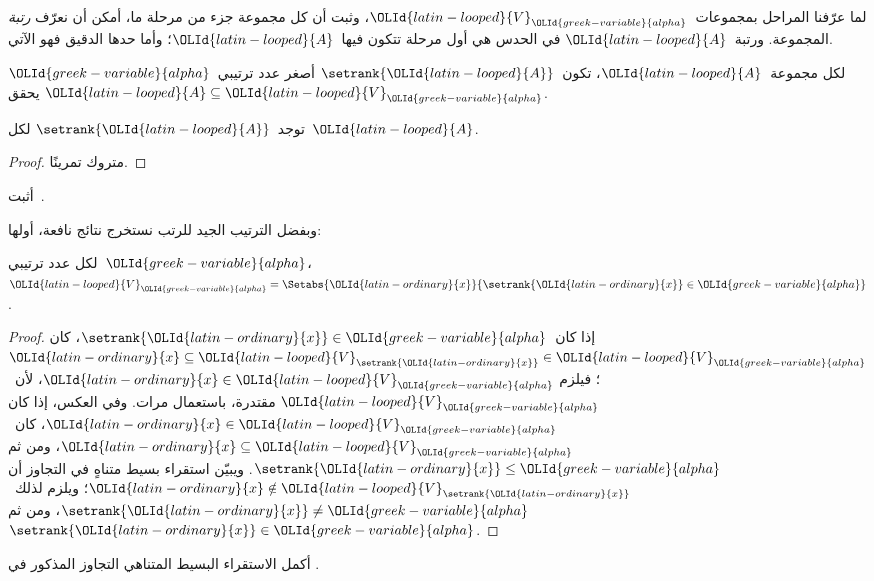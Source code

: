 \documentclass[../../../include/open-logic-section]{subfiles}
\begin{document}

لما عرّفنا المراحل بمجموعات~${\OLId{latin-looped}{V}}_{\OLId{greek-variable}{alpha}}$، وثبت أن كل مجموعة جزء من
مرحلة ما، أمكن أن نعرّف \emph{رتبة} المجموعة. ورتبة~${\OLId{latin-looped}{A}}$ في الحدس
هي أول مرحلة تتكون فيها~${\OLId{latin-looped}{A}}$؛ وأما حدها الدقيق فهو الآتي.

\begin{defn}
لكل مجموعة~${\OLId{latin-looped}{A}}$، تكون~$\setrank{{\OLId{latin-looped}{A}}}$ أصغر عدد ترتيبي~${\OLId{greek-variable}{alpha}}$ يحقق
${\OLId{latin-looped}{A}} \subseteq {\OLId{latin-looped}{V}}_{\OLId{greek-variable}{alpha}}$.
\end{defn}
\begin{prop}
	توجد~$\setrank{{\OLId{latin-looped}{A}}}$ لكل~${\OLId{latin-looped}{A}}$.
\end{prop}
\begin{proof}
	متروك تمرينًا.
\end{proof}
\begin{prob}
	أثبت~.
\end{prob}
\noindent
وبفضل الترتيب الجيد للرتب نستخرج نتائج نافعة، أولها:
\begin{prop}
لكل عدد ترتيبي~${\OLId{greek-variable}{alpha}}$،
${\OLId{latin-looped}{V}}_{\OLId{greek-variable}{alpha}} = \Setabs{{\OLId{latin-ordinary}{x}}}{\setrank{{\OLId{latin-ordinary}{x}}} \in {\OLId{greek-variable}{alpha}}}$.
\end{prop}

\begin{proof}
إذا كان~$\setrank{{\OLId{latin-ordinary}{x}}} \in {\OLId{greek-variable}{alpha}}$، كان
${\OLId{latin-ordinary}{x}} \subseteq {\OLId{latin-looped}{V}}_{\setrank{{\OLId{latin-ordinary}{x}}}} \in {\OLId{latin-looped}{V}}_{\OLId{greek-variable}{alpha}}$؛ فيلزم
${\OLId{latin-ordinary}{x}} \in {\OLId{latin-looped}{V}}_{\OLId{greek-variable}{alpha}}$، لأن~${\OLId{latin-looped}{V}}_{\OLId{greek-variable}{alpha}}$ مقتدرة، باستعمال
 مرات. وفي العكس، إذا كان
${\OLId{latin-ordinary}{x}} \in {\OLId{latin-looped}{V}}_{\OLId{greek-variable}{alpha}}$، كان~${\OLId{latin-ordinary}{x}} \subseteq {\OLId{latin-looped}{V}}_{\OLId{greek-variable}{alpha}}$، ومن ثم
$\setrank{{\OLId{latin-ordinary}{x}}} \leq {\OLId{greek-variable}{alpha}}$. ويبيّن استقراء بسيط متناهٍ في التجاوز أن
${\OLId{latin-ordinary}{x}} \notin {\OLId{latin-looped}{V}}_{\setrank{{\OLId{latin-ordinary}{x}}}}$؛ ويلزم لذلك~$\setrank{{\OLId{latin-ordinary}{x}}} \neq {\OLId{greek-variable}{alpha}}$،
ومن ثم~$\setrank{{\OLId{latin-ordinary}{x}}} \in {\OLId{greek-variable}{alpha}}$.
\end{proof}
\begin{prob}
	أكمل الاستقراء البسيط المتناهي التجاوز المذكور في
	.
\end{prob}
\end{document}
